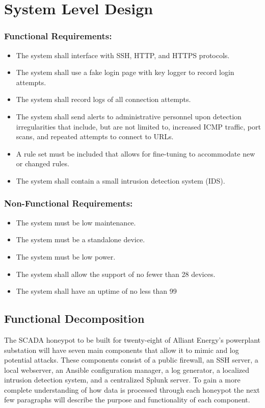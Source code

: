 \chapter{System Level Design}

\blindtext

\subsection{Functional Requirements:}
\begin{itemize}
\item The system shall interface with SSH, HTTP, and HTTPS protocols.
\item The system shall use a fake login page with key logger to record login attempts.
\item The system shall record logs of all connection attempts.
\item The system shall send alerts to administrative personnel upon detection irregularities that include, but are not limited to, increased ICMP traffic, port scans, and repeated attempts to connect to URLs.
\item A rule set must be included that allows for fine-tuning to accommodate new or changed rules.
\item The system shall contain a small intrusion detection system (IDS).
\end{itemize}

\subsection{Non-Functional Requirements:}
\begin{itemize}
\item The system must be low maintenance.
\item The system must be a standalone device.
\item The system must be low power.
\item The system shall allow the support of no fewer than 28 devices.
\item The system shall have an uptime of no less than 99%
\end{itemize}

\section{Functional Decomposition}

The SCADA honeypot to be built for twenty-eight of Alliant Energy's powerplant substation will have seven main components that allow it to mimic and log potential attacks.  These components consist of a public firewall, an SSH server, a local webserver, an Ansible configuration manager, a log generator, a localized intrusion detection system, and a centralized Splunk server.  To gain a more complete understanding of how data is processed through each honeypot the next few paragraphs will describe the purpose and functionality of each component.

